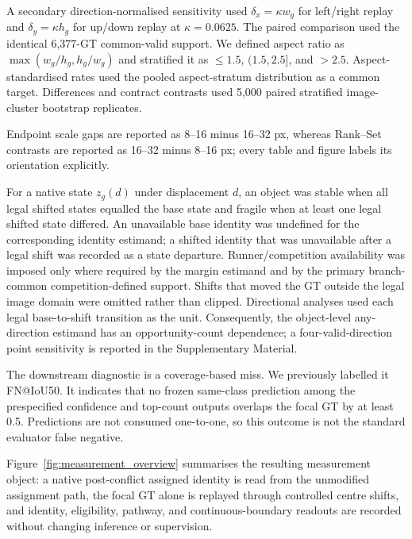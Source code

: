 A secondary direction-normalised sensitivity used $\delta_x=\kappa w_g$ for left/right replay and $\delta_y=\kappa h_g$ for up/down replay at $\kappa=0.0625$. The paired comparison used the identical 6,377-GT common-valid support. We defined aspect ratio as $\max(w_g/h_g,h_g/w_g)$ and stratified it as $\leq1.5$, $(1.5,2.5]$, and $>2.5$. Aspect-standardised rates used the pooled aspect-stratum distribution as a common target. Differences and contract contrasts used 5,000 paired stratified image-cluster bootstrap replicates.

Endpoint scale gaps are reported as 8--16 minus 16--32 px, whereas Rank--Set contrasts are reported as 16--32 minus 8--16 px; every table and figure labels its orientation explicitly.

For a native state $z_g(d)$ under displacement $d$, an object was stable when all legal shifted states equalled the base state and fragile when at least one legal shifted state differed. An unavailable base identity was undefined for the corresponding identity estimand; a shifted identity that was unavailable after a legal shift was recorded as a state departure. Runner/competition availability was imposed only where required by the margin estimand and by the primary branch-common competition-defined support. Shifts that moved the GT outside the legal image domain were omitted rather than clipped. Directional analyses used each legal base-to-shift transition as the unit. Consequently, the object-level any-direction estimand has an opportunity-count dependence; a four-valid-direction point sensitivity is reported in the Supplementary Material.

The downstream diagnostic is a coverage-based miss. We previously labelled it FN@IoU50. It indicates that no frozen same-class prediction among the prespecified confidence and top-count outputs overlaps the focal GT by at least 0.5. Predictions are not consumed one-to-one, so this outcome is not the standard evaluator false negative.

Figure~\ref{fig:measurement_overview} summarises the resulting measurement object: a native post-conflict assigned identity is read from the unmodified assignment path, the focal GT alone is replayed through controlled centre shifts, and identity, eligibility, pathway, and continuous-boundary readouts are recorded without changing inference or supervision.

